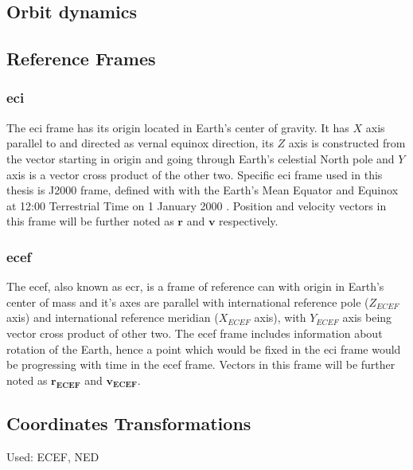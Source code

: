 \subsection{Orbit dynamics}



    \subsection{Reference Frames}
        \subsubsection{\ac*{eci}}
            The \ac{eci} frame has its origin located in Earth's center of gravity. It has $X$ axis parallel to and directed as vernal equinox direction, its $Z$ axis is constructed from the vector starting in origin and going through Earth's celestial North pole and $Y$ axis is a vector cross product of the other two. Specific \ac{eci} frame used in this thesis is J2000 frame, defined with with the Earth's Mean Equator and Equinox at 12:00 Terrestrial Time on 1 January 2000 \cite{schutz2004statistical}. Position and velocity vectors in this frame will be further noted as $\textbf{r}$ and $\textbf{v}$ respectively.

        \subsubsection{\ac*{ecef}}
            The \ac{ecef}, also known as \ac{ecr}, is a frame of reference can with origin in Earth's center of mass and it's axes are parallel with international reference pole ($Z_{ECEF}$ axis) and international reference meridian ($X_{ECEF}$ axis), with $Y_{ECEF}$ axis being vector cross product of other two. The \ac{ecef} frame includes information about rotation of the Earth, hence a point which would be fixed in the \ac{eci} frame would be progressing with time in the \ac{ecef} frame. Vectors in this frame will be further noted as $\textbf{r}_{\textbf{ECEF}}$ and $\textbf{v}_{\textbf{ECEF}} $.


    \subsection{Coordinates Transformations}
        Used: ECEF, NED


